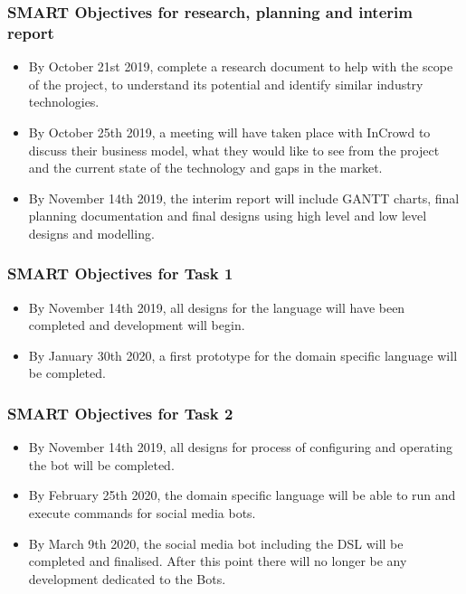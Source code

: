 \documentclass[chapterprefix=false]{scrreprt}
\begin{document}
\subsubsection{SMART Objectives for research, planning and interim report}

\begin{itemize}
 \setlength\itemsep{-0.75em}
 \item By October 21st 2019, complete a research document to help with the scope of the project, to understand its potential and identify similar industry technologies.
 \item By October 25th 2019, a meeting will have taken place with InCrowd to discuss their business model, what they would like to see from the project and the current state of the technology and gaps in the market.
 \item By November 14th 2019, the interim report will include GANTT charts, final planning documentation and final designs using high level and low level designs and modelling.
\end{itemize}
 
\subsubsection{SMART Objectives for Task 1}

\begin{itemize}
 \setlength\itemsep{-0.75em}
 \item By November 14th 2019, all designs for the language will have been completed and development will begin.
 \item By January 30th 2020, a first prototype for the domain specific language will be completed.
\end{itemize}

\subsubsection{SMART Objectives for Task 2}

\begin{itemize}
 \setlength\itemsep{-0.75em}
 \item By November 14th 2019, all designs for process of configuring and operating the bot will be completed.
 \item By February 25th 2020, the domain specific language will be able to run and execute commands for social media bots.
 \item By March 9th 2020, the social media bot including the DSL will be completed and finalised. After this point there will no longer be any development dedicated to the Bots.
\end{itemize}
\end{document}
